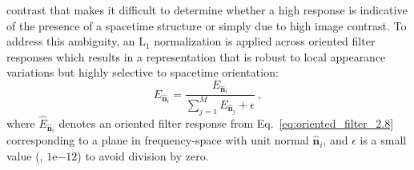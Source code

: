 contrast that makes 
it difficult to determine
whether a high response is indicative of the presence of
a spacetime structure or simply due to high image
contrast.
To address this ambiguity, an $\textrm{L}_1$
normalization is applied across oriented filter responses which
results in a representation that is robust to local
appearance variations but highly selective to 
spacetime orientation:
\begin{equation}
	\hat{E}_{\hat{\mathbf{n}}_i} = \frac{E_{\hat{\mathbf{n}}_i}}{\sum_{j = 1}^{M}{E_{\hat{\mathbf{n}}_j}} + \epsilon} \ ,
\end{equation}
where $\hat{E}_{\hat{\mathbf{n}}_i}$ denotes an oriented filter response from Eq.\ \ref{eq:oriented_filter_2.8} corresponding to a plane in frequency-space with unit normal $\hat{\mathbf{n}}_i$, and $\epsilon$ is a small value (\eg, $1\mathrm{e}{-12}$) to avoid division by zero.